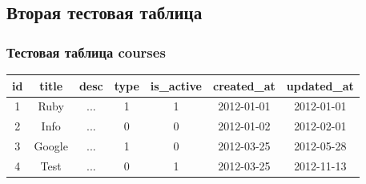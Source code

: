 \documentclass[compress,red]{beamer}
\begin{document}
\subsection{Вторая тестовая таблица}
\begin{frame}[fragile]
  \frametitle{Тестовая таблица courses}
  \begin{tabular}{|c|c|c|c|c|c|c|}
  \hline
  id & title & desc & type & is\_active & created\_at & updated\_at\\
  \hline
  1 & Ruby & ... & 1 & 1 & 2012-01-01 & 2012-01-01\\
  \hline
  2 & Info & ... & 0 & 0 & 2012-01-02 & 2012-02-01\\
  \hline
  3 & Google & ... & 1 & 0 & 2012-03-25 & 2012-05-28\\
  \hline
  4 & Test & ... & 0 & 1 & 2012-03-25 & 2012-11-13\\
  \hline
  \end{tabular}
\end{frame}
\end{document}

